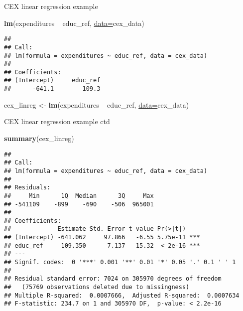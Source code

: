 \documentclass[ignorenonframetext,]{beamer}
\newenvironment{Shaded}{\begin{snugshade}}{\end{snugshade}}
\newcommand{\KeywordTok}[1]{\textcolor[rgb]{0.26,0.66,0.93}{\textbf{#1}}}
\newcommand{\DataTypeTok}[1]{\textcolor[rgb]{0.74,0.68,0.62}{\underline{#1}}}
\newcommand{\StringTok}[1]{\textcolor[rgb]{0.02,0.61,0.04}{#1}}
\newcommand{\OperatorTok}[1]{\textcolor[rgb]{0.74,0.68,0.62}{#1}}
\newcommand{\NormalTok}[1]{\textcolor[rgb]{0.74,0.68,0.62}{#1}}
\begin{document}
\begin{frame}[fragile]{CEX linear regression example}

\begin{Shaded}
\begin{Highlighting}[]
\KeywordTok{lm}\NormalTok{(expenditures }\OperatorTok{~}\StringTok{ }\NormalTok{educ_ref, }\DataTypeTok{data=}\NormalTok{cex_data)}
\end{Highlighting}
\end{Shaded}

\begin{verbatim}
## 
## Call:
## lm(formula = expenditures ~ educ_ref, data = cex_data)
## 
## Coefficients:
## (Intercept)     educ_ref  
##      -641.1        109.3
\end{verbatim}

\begin{Shaded}
\begin{Highlighting}[]
\NormalTok{cex_linreg <-}\StringTok{ }\KeywordTok{lm}\NormalTok{(expenditures }\OperatorTok{~}\StringTok{ }\NormalTok{educ_ref, }
                 \DataTypeTok{data=}\NormalTok{cex_data)}
\end{Highlighting}
\end{Shaded}

\end{frame}

\begin{frame}[fragile]{CEX linear regression example ctd}

\begin{Shaded}
\begin{Highlighting}[]
\KeywordTok{summary}\NormalTok{(cex_linreg)}
\end{Highlighting}
\end{Shaded}

\begin{verbatim}
## 
## Call:
## lm(formula = expenditures ~ educ_ref, data = cex_data)
## 
## Residuals:
##     Min      1Q  Median      3Q     Max 
## -541109    -899    -690    -506  965001 
## 
## Coefficients:
##             Estimate Std. Error t value Pr(>|t|)    
## (Intercept) -641.062     97.866   -6.55 5.75e-11 ***
## educ_ref     109.350      7.137   15.32  < 2e-16 ***
## ---
## Signif. codes:  0 '***' 0.001 '**' 0.01 '*' 0.05 '.' 0.1 ' ' 1
## 
## Residual standard error: 7024 on 305970 degrees of freedom
##   (75769 observations deleted due to missingness)
## Multiple R-squared:  0.0007666,  Adjusted R-squared:  0.0007634 
## F-statistic: 234.7 on 1 and 305970 DF,  p-value: < 2.2e-16
\end{verbatim}

\end{frame}
\end{document}
